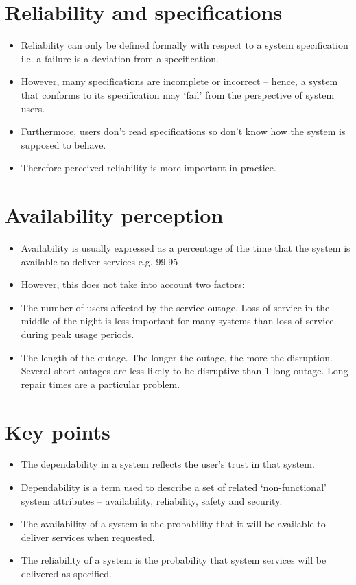 \section{Reliability and specifications}
\begin{itemize}
\item Reliability can only be defined formally with respect to a system specification i.e. a failure is a deviation from a specification.

\item However, many specifications are incomplete or incorrect – hence, a system that conforms to its specification may ‘fail’ from the perspective of system users.

\item Furthermore, users don’t read specifications so don’t know how the system is supposed to behave.

\item Therefore perceived reliability is more important in practice.
\end{itemize}
\section{Availability perception}
\begin{itemize}
\item Availability is usually expressed as a percentage of the time that the system is available to deliver services e.g. 99.95%

\item However, this does not take into account two factors:

  \item The number of users affected by the service outage. Loss of service in the middle of the night is less important for many systems than loss of service during peak usage periods.
  \item The length of the outage. The longer the outage, the more the disruption. Several short outages are less likely to be disruptive than 1 long outage. Long repair times are a particular problem.

\end{itemize}
\section{Key points}
\begin{itemize}
\item The dependability in a system reflects the user’s trust in that system.

\item Dependability is a term used to describe a set of related ‘non-functional’ system attributes – availability, reliability, safety and security.

\item The availability of a system is the probability that it will be available to deliver services when requested.

\item The reliability of a system is the probability that system services will be delivered as specified.

\end{itemize}
